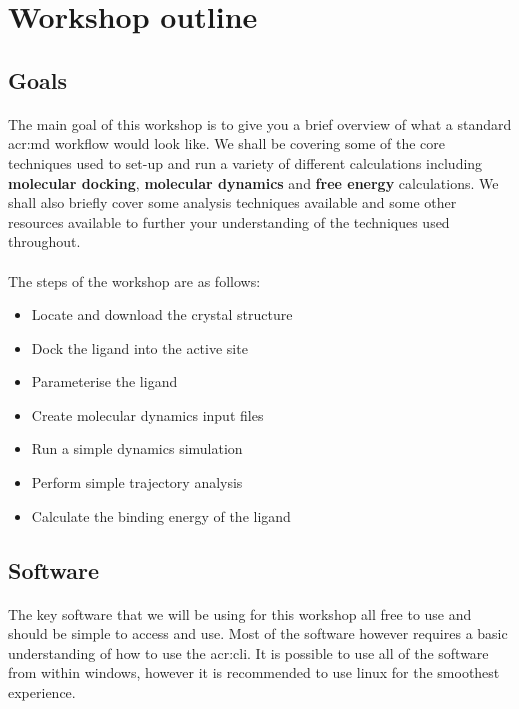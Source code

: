 \section{Workshop outline}
\label{sec:intro}

\subsection{Goals}
    \paragraph{}
    The main goal of this workshop is to give you a brief overview of what a standard \gls{acr:md} workflow would look like. We shall be covering some of the core techniques used to set-up and run a variety of different calculations including \textbf{molecular docking}, \textbf{molecular dynamics} and \textbf{free energy} calculations. We shall also briefly cover some analysis techniques available and some other resources available to further your understanding of the techniques used throughout. 

    \paragraph{}
    The steps of the workshop are as follows:
    \begin{itemize}
        \item Locate and download the crystal structure
        \item Dock the ligand into the active site
        \item Parameterise the ligand
        \item Create molecular dynamics input files
        \item Run a simple dynamics simulation
        \item Perform simple trajectory analysis
        \item Calculate the binding energy of the ligand
    \end{itemize}


\subsection{Software}
    \paragraph{}
    The key software that we will be using for this workshop all free to use and should be simple to access and use. Most of the software however requires a basic understanding of how to use the \gls{acr:cli}. It is possible to use all of the software from within windows, however it is recommended to use linux for the smoothest experience. 

